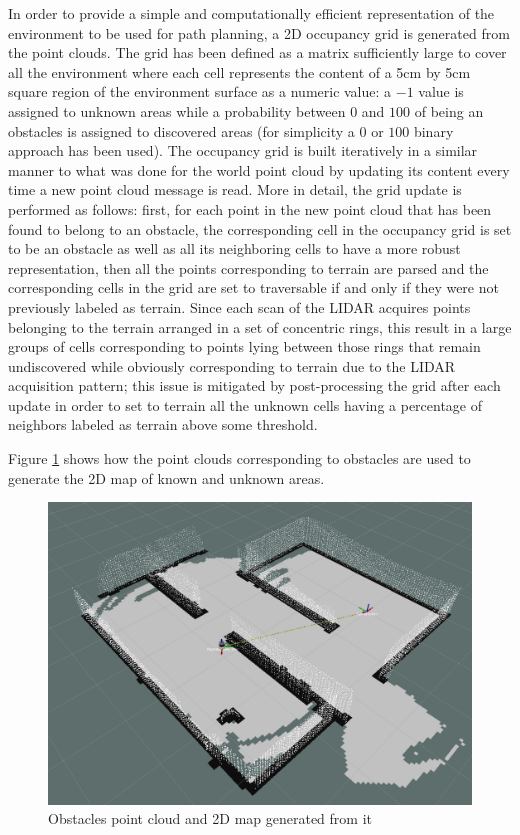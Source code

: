 \documentclass[9pt,conference]{IEEEtran}
\begin{document}
In order to provide a simple and computationally efficient representation of the environment to be used for path planning, a 2D occupancy grid is generated from the point clouds. The grid has been defined as a matrix sufficiently large to cover all the environment where each cell represents the content of a 5cm by 5cm square region of the environment surface as a numeric value: a $-1$ value is assigned to unknown areas while a probability between $0$ and $100$ of being an obstacles is assigned to discovered areas (for simplicity a $0$ or $100$ binary approach has been used). The occupancy grid is built iteratively in a similar manner to what was done for the world point cloud by updating its content every time a new point cloud message is read. More in detail, the grid update is performed as follows: first, for each point in the new point cloud that has been found to belong to an obstacle, the corresponding cell in the occupancy grid is set to be an obstacle as well as all its neighboring cells to have a more robust representation, then all the points corresponding to terrain are parsed and the corresponding cells in the grid are set to traversable if and only if they were not previously labeled as terrain. Since each scan of the LIDAR acquires points belonging to the terrain arranged in a set of concentric rings, this result in a large groups of cells corresponding to points lying between those rings that remain undiscovered while obviously corresponding to terrain due to the LIDAR acquisition pattern; this issue is mitigated by post-processing the grid after each update in order to set to terrain all the unknown cells having a percentage of neighbors labeled as terrain above some threshold.

Figure \ref{fig:obstacles-2Dmap} shows how the point clouds corresponding to obstacles are used to generate the 2D map of known and unknown areas.

\begin{figure}[h!]
    \centering
    \includegraphics[width=1\linewidth]{images/02E obstacles+map2d crop.png}
    \caption{Obstacles point cloud and 2D map generated from it}
    \label{fig:obstacles-2Dmap}
\end{figure}
\end{document}
